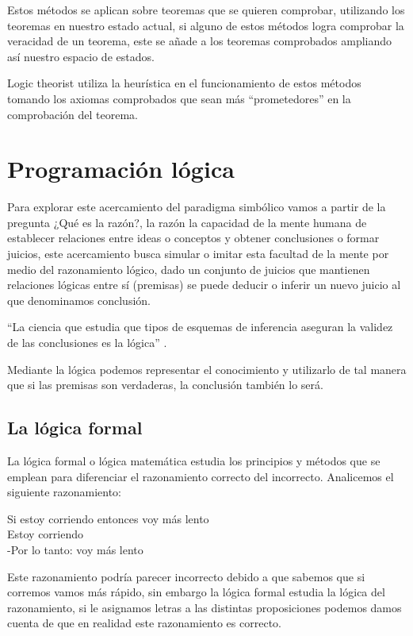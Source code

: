 \documentclass[11pt,fleqn]{book} %
\begin{document}
Estos métodos se aplican sobre teoremas que se quieren comprobar, utilizando los teoremas en nuestro estado actual, si alguno de estos métodos logra comprobar la veracidad de un teorema, este se añade a los teoremas comprobados ampliando así nuestro espacio de estados.

Logic theorist utiliza la heurística en el funcionamiento de estos métodos tomando los axiomas comprobados que sean más “prometedores” en la comprobación del teorema.

\section{Programación lógica} 

Para explorar este acercamiento del paradigma simbólico vamos a partir de la pregunta ¿Qué es la razón?, la razón la capacidad de la mente humana de establecer relaciones entre ideas o conceptos y obtener conclusiones o formar juicios, este acercamiento busca simular o imitar esta facultad de la mente por medio del razonamiento lógico, dado un conjunto de juicios que mantienen relaciones lógicas entre sí (premisas) se puede deducir o inferir un nuevo juicio al que denominamos conclusión.

“La ciencia que estudia que tipos de esquemas de inferencia aseguran la validez de las conclusiones es la lógica” \cite{munoz2013introduccion}.

Mediante la lógica podemos representar el conocimiento y utilizarlo de tal manera que si las premisas son verdaderas, la conclusión también lo será.

\subsection{La lógica formal} 

La lógica formal o lógica matemática estudia los principios y métodos que se emplean para diferenciar el razonamiento correcto del incorrecto.
Analicemos el siguiente razonamiento:

Si estoy corriendo entonces voy más lento\\
Estoy corriendo\\
-Por lo tanto: voy más lento

Este razonamiento podría parecer incorrecto debido a que sabemos que si corremos vamos más rápido, sin embargo la lógica formal estudia la lógica del razonamiento, si le asignamos letras a las distintas proposiciones podemos damos cuenta de que en realidad este razonamiento es correcto.
\end{document}
